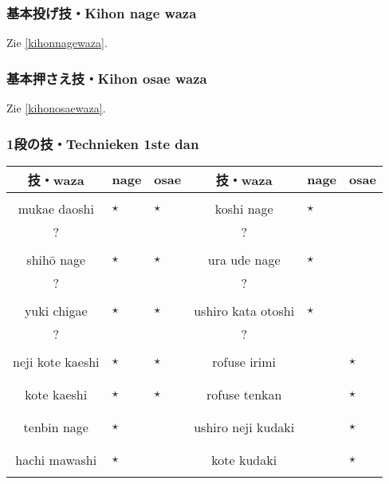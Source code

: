 \subsubsection{基本投げ技・Kihon nage waza}
Zie \ref{kihonnagewaza}.

\subsubsection{基本押さえ技・Kihon osae waza}
Zie \ref{kihonosaewaza}.

\subsubsection{1段の技・Technieken 1ste dan}
\begin{table}[H]
\begin{center}
\begin{tabular}{c|s|s|c|s|s}
    {\bfseries 技・waza} & {\bfseries nage} & {\bfseries osae} & {\bfseries 技・waza} & {\bfseries nage} & {\bfseries osae}\\
    \hline
    \ruby{}{}\ruby{}{} &  &  & \ruby{}{}\ruby{}{} &  & \\
    mukae daoshi & $\star$ & $\star$ & koshi nage & $\star$ & \\
    ? &  &  & ? &  & \\
    \ruby{}{}\ruby{}{} &  &  & \ruby{}{}\ruby{}{} &  & \\
    shih\={o} nage & $\star$ & $\star$ & ura ude nage & $\star$ & \\
    ? &  &  & ? &  & \\
    \ruby{}{}\ruby{}{} &  &  & \ruby{}{}\ruby{}{} &  & \\
    yuki chigae & $\star$ & $\star$ & ushiro kata otoshi & $\star$ & \\
    ? &  &  & ? &  & \\
    \ruby{}{} &  &  & \ruby{}{}\ruby{}{} &  & \\
    neji kote kaeshi & $\star$ & $\star$ & rofuse irimi &  & $\star$\\
     &  &  &  &  & \\
    \ruby{}{} &  &  & \ruby{}{} &  & \\
    kote kaeshi & $\star$ & $\star$ & rofuse tenkan &  & $\star$\\
     &  &  &  &  & \\
    \ruby{}{}\ruby{}{} &  &  & \ruby{}{}\ruby{}{} &  & \\
    tenbin nage & $\star$ &  & ushiro neji kudaki &  & $\star$\\
     &  &  &  &  & \\
    \ruby{}{}\ruby{}{} &  &  & \ruby{}{} &  & \\
    hachi mawashi & $\star$ &  & kote kudaki &  & $\star$\\
     &  &  &  & 
\end{tabular}
\end{center}
\label{dan_1_kihonnagewaza}
\end{table}

